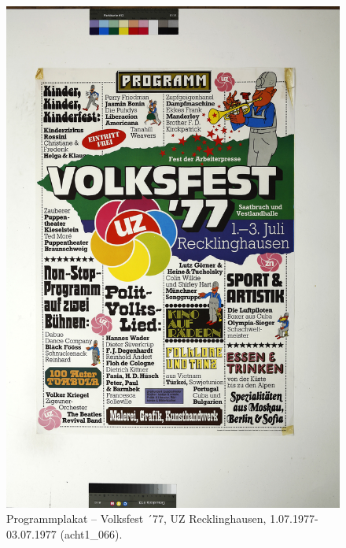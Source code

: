\documentclass[a4paper,12pt,ngerman]{article}
\begin{document}
\newpage
\begin{figure}[ht]
\includegraphics[width=\linewidth]{Abbildung_2_(acht1_066)}
\centering
\caption{Programmplakat – Volksfest ´77, UZ Recklinghausen, 1.07.1977-03.07.1977 (acht1\_066).}
\end{figure}
\end{document}
